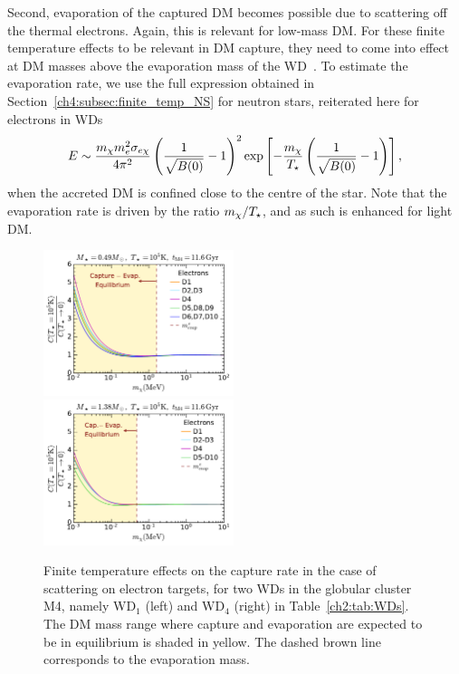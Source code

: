 Second, evaporation of the captured DM becomes possible due to scattering off the thermal electrons.  Again, this is relevant for low-mass DM. 
For these finite temperature effects to be relevant in DM capture, they need to come into effect at DM masses above the evaporation mass of the WD~\cite{Garani:2018kkd_may_NewAnalysisNeutron, Bell:2020lmm_mar_ImprovedTreatmentDark}. 
To estimate the evaporation rate, we use  the full expression  obtained in Section~\ref{ch4:subsec:finite_temp_NS} for neutron stars, reiterated here for electrons in WDs
\begin{equation}
E \sim  \frac{ m_\chi m_e^2\sigma_{e\chi}}{4\pi^2} \left(\frac{1}{\sqrt{B(0)}}-1\right)^2  \exp\left[{-\frac{m_\chi}{T_\star}}\left(\frac{1}{\sqrt{B(0)}}-1\right)\right],  
\label{ch4:eq:evap_WD}
\end{equation}
when the accreted DM is confined close to the centre of the star. 
Note that the evaporation rate is driven by the ratio $m_\chi/T_\star$, and as such is enhanced for light DM. 

\begin{figure}[t!bp]
    \centering
  \includegraphics[width=0.495\textwidth]{wd_capture/R_CT_mdm_10_5K_D1_D10_e_M4S_0.49Msun.pdf}
  \includegraphics[width=0.495\textwidth]{wd_capture/R_CT_mdm_10_5K_D1_D10_e_M4S_1.38Msun.pdf} 
    \caption[Finite temperature effects on the capture rate in the case of scattering on electron targets, for two WDs in the globular cluster M4, namely WD$_1$ (left) and WD$_4$ (right) in Table~\ref{ch2:tab:WDs}.]{Finite temperature effects on the capture rate in the case of scattering on electron targets, for two WDs in the globular cluster M4, namely WD$_1$ (left) and WD$_4$ (right) in Table~\ref{ch2:tab:WDs}. The DM mass range where capture and evaporation are expected to be in equilibrium is shaded in yellow. The dashed brown line corresponds to the evaporation mass.}
    \label{ch4:fig:capTfinelec}
\end{figure}


